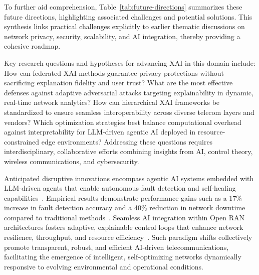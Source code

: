 \documentclass[sigconf]{acmart}
\begin{document}
To further aid comprehension, Table~\ref{tab:future-directions} summarizes these future directions, highlighting associated challenges and potential solutions. This synthesis links practical challenges explicitly to earlier thematic discussions on network privacy, security, scalability, and AI integration, thereby providing a cohesive roadmap.

Key research questions and hypotheses for advancing XAI in this domain include: How can federated XAI methods guarantee privacy protections without sacrificing explanation fidelity and user trust? What are the most effective defenses against adaptive adversarial attacks targeting explainability in dynamic, real-time network analytics? How can hierarchical XAI frameworks be standardized to ensure seamless interoperability across diverse telecom layers and vendors? Which optimization strategies best balance computational overhead against interpretability for LLM-driven agentic AI deployed in resource-constrained edge environments? Addressing these questions requires interdisciplinary, collaborative efforts combining insights from AI, control theory, wireless communications, and cybersecurity.

Anticipated disruptive innovations encompass agentic AI systems embedded with LLM-driven agents that enable autonomous fault detection and self-healing capabilities~\cite{ref55}. Empirical results demonstrate performance gains such as a 17\% increase in fault detection accuracy and a 40\% reduction in network downtime compared to traditional methods~\cite{ref55}. Seamless AI integration within Open RAN architectures fosters adaptive, explainable control loops that enhance network resilience, throughput, and resource efficiency~\cite{ref54}. Such paradigm shifts collectively promote transparent, robust, and efficient AI-driven telecommunications, facilitating the emergence of intelligent, self-optimizing networks dynamically responsive to evolving environmental and operational conditions.
\end{document}
